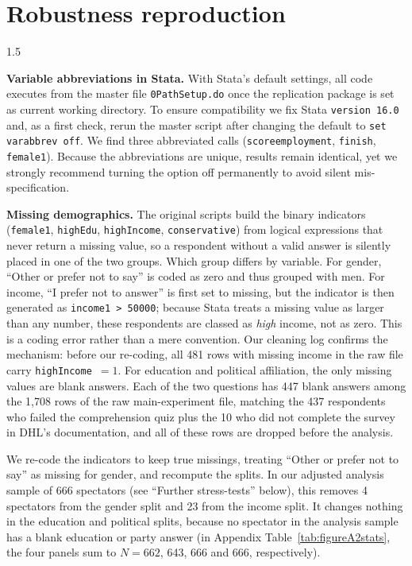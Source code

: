 \documentclass[12pt,a4paper]{article}
\begin{document}

\section{Robustness reproduction}
\label{sec:robustness}


\begin{spacing}{1.5}

\medskip
\noindent\textbf{Variable abbreviations in Stata.}
With Stata's default settings, all code executes from the master file \texttt{0PathSetup.do} once the replication package is set as current working directory. To ensure compatibility we fix Stata \texttt{version 16.0} and, as a first check, rerun the master script after changing the default to \texttt{set varabbrev off}. We find three abbreviated calls (\texttt{scoreemployment}, \texttt{finish}, \texttt{female1}). Because the abbreviations are unique, results remain identical, yet we strongly recommend turning the option off permanently to avoid silent mis-specification.

\medskip
\noindent\textbf{Missing demographics.}
The original scripts build the binary indicators (\texttt{female1}, \texttt{highEdu}, \texttt{highIncome}, \texttt{conservative}) from logical expressions that never return a missing value, so a respondent without a valid answer is silently placed in one of the two groups. Which group differs by variable. For gender, ``Other or prefer not to say'' is coded as zero and thus grouped with men. For income, ``I prefer not to answer'' is first set to missing, but the indicator is then generated as \texttt{income1~>~50000}; because Stata treats a missing value as larger than any number, these respondents are classed as \emph{high} income, not as zero. This is a coding error rather than a mere convention. Our cleaning log confirms the mechanism: before our re-coding, all 481 rows with missing income in the raw file carry \texttt{highIncome}~$=1$. For education and political affiliation, the only missing values are blank answers. Each of the two questions has 447 blank answers among the 1,708 rows of the raw main-experiment file, matching the 437 respondents who failed the comprehension quiz plus the 10 who did not complete the survey in DHL's documentation, and all of these rows are dropped before the analysis.

We re-code the indicators to keep true missings, treating ``Other or prefer not to say'' as missing for gender, and recompute the splits. In our adjusted analysis sample of 666 spectators (see ``Further stress-tests'' below), this removes 4 spectators from the gender split and 23 from the income split. It changes nothing in the education and political splits, because no spectator in the analysis sample has a blank education or party answer (in Appendix Table~\ref{tab:figureA2stats}, the four panels sum to $N=662$, 643, 666 and 666, respectively).


\end{spacing}
\end{document}
